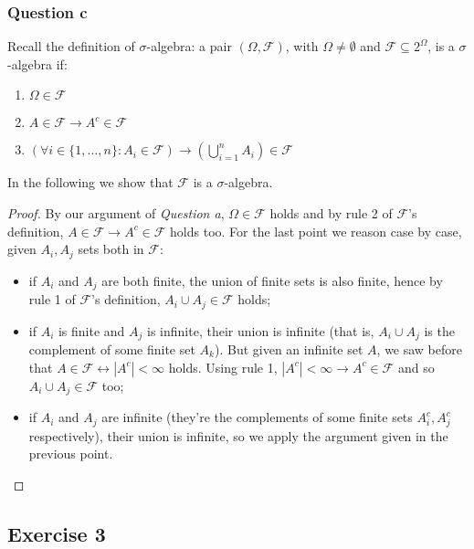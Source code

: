 \subsubsection{Question c}
Recall the definition of $\sigma$-algebra: a pair $(\Omega,
\mathcal{F})$, with $\Omega \not = \emptyset$ and $\mathcal{F}
\subseteq 2^\Omega$, is a $\sigma$-algebra if:
\begin{enumerate}
\item $\Omega \in \mathcal{F}$
\item $A \in \mathcal{F} \rightarrow A^c \in \mathcal{F}$
\item $\left( \forall i\in\{1,\ldots, n\}: A_i \in \mathcal{F} \right)
  \rightarrow \left(\bigcup_{i=1}^{n} A_i \right ) \in \mathcal{F}$
\end{enumerate}
In the following we show that $\mathcal{F}$ is a $\sigma$-algebra.
\begin{proof}
  By our argument of \emph{Question a}, $\Omega \in \mathcal{F}$ holds
  and by rule 2 of $\mathcal{F}$'s definition, $A \in \mathcal{F}
  \rightarrow A^c \in \mathcal{F}$ holds too. For the last point we
  reason case by case, given $A_i, A_j$ sets both in $\mathcal{F}$:
  \begin{itemize}
  \item if $A_i$ and $A_j$ are both finite, the union of finite sets
    is also finite, hence by rule 1 of $\mathcal{F}$'s definition,
    $A_i \cup A_j \in \mathcal{F}$ holds;
  \item if $A_i$ is finite and $A_j$ is infinite, their union is
    infinite (that is, $A_i \cup A_j$ is the complement of some finite
    set $A_k$). But given an infinite set $A$, we saw before that $A
    \in \mathcal{F} \leftrightarrow |A^c| < \infty$ holds. Using rule
    1, $|A^c| < \infty \rightarrow A^c \in \mathcal{F}$ and so $A_i
    \cup A_j \in \mathcal{F}$ too;
  \item if $A_i$ and $A_j$ are infinite (they're the complements of
    some finite sets $A_i^c, A_j^c$ respectively), their union is
    infinite, so we apply the argument given in the previous point.
  \end{itemize}
\end{proof}

\subsection{Exercise 3}
